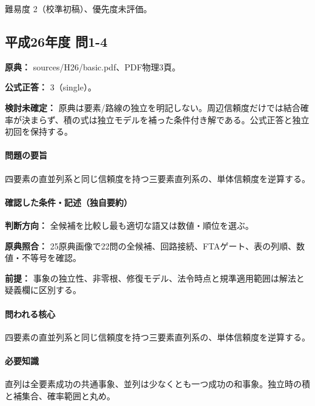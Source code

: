 \par 難易度 2（校準初稿）、優先度未評価。

\subsection{平成26年度 問1-4}
\label{q:h26-reg-basic-1-4}

\noindent\textbf{原典：} sources/H26/basic.pdf、PDF物理3頁。

\textbf{公式正答：} 3（single）。

\par\textbf{検討未確定：} 原典は要素/路線の独立を明記しない。周辺信頼度だけでは結合確率が決まらず、積の式は独立モデルを補った条件付き解である。公式正答と独立初回を保持する。

\paragraph{問題の要旨} 四要素の直並列系と同じ信頼度を持つ三要素直列系の、単体信頼度を逆算する。

\paragraph{確認した条件・記述（独自要約）}\mbox{}\par

\noindent\textbf{判断方向：} 全候補を比較し最も適切な語又は数値・順位を選ぶ。\par

\noindent\textbf{原典照合：} 25原典画像で22問の全候補、回路接続、FTAゲート、表の列順、数値・不等号を確認。\par

\noindent\textbf{前提：} 事象の独立性、非零根、修復モデル、法令時点と規準適用範囲は解法と疑義欄に区別する。\par

\paragraph{問われる核心} 四要素の直並列系と同じ信頼度を持つ三要素直列系の、単体信頼度を逆算する。

\paragraph{必要知識} 直列は全要素成功の共通事象、並列は少なくとも一つ成功の和事象。独立時の積と補集合、確率範囲と丸め。

